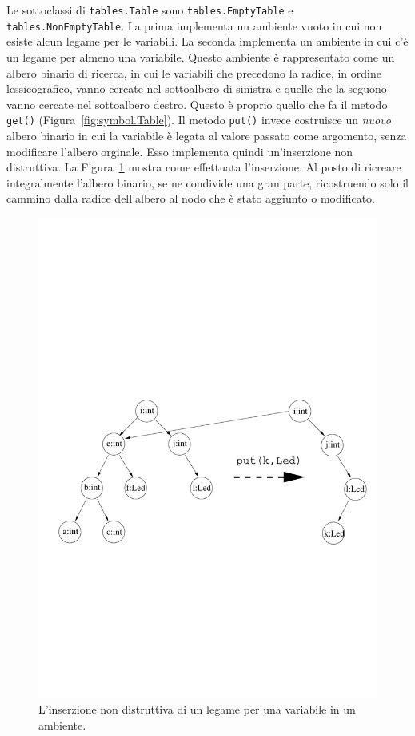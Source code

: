 Le sottoclassi di \texttt{tables.Table} sono
\texttt{tables.EmptyTable} e \texttt{tables.NonEmptyTable}.
La prima implementa un ambiente vuoto in cui non esiste alcun legame
per le variabili. La seconda implementa un ambiente in cui c'\`e
un legame per almeno una variabile. Questo ambiente \`e rappresentato come
un albero binario di ricerca, in cui \cioe le variabili
che precedono la radice, in ordine lessicografico,
vanno cercate nel sottoalbero di sinistra e quelle che la seguono
vanno cercate nel sottoalbero destro. Questo \`e proprio quello che fa il
metodo \texttt{get()} (Figura~\ref{fig:symbol.Table}).
Il metodo \texttt{put()} invece costruisce
un \emph{nuovo} albero binario in cui la variabile \`e legata al valore
passato come argomento, senza modificare l'albero orginale. Esso implementa
quindi un'inserzione non distruttiva. La Figura~\ref{fig:non_destructive}
mostra come \e effettuata l'inserzione. Al posto di ricreare
integralmente l'albero binario, se ne condivide una gran parte,
ricostruendo solo il cammino dalla radice dell'albero al nodo che
\`e stato aggiunto o modificato.
%
\begin{figure}[t]
\vspace*{-33ex}
\begin{center}
\includegraphics[width=15cm]{insertion.pdf}
\end{center}
\vspace*{-33ex}
\caption{L'inserzione non distruttiva di un legame per una variabile in un ambiente.}\label{fig:non_destructive}
\end{figure}

